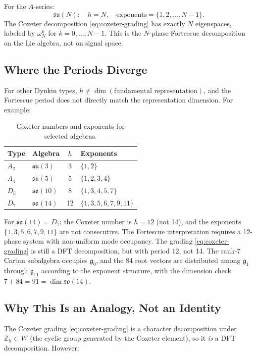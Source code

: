 \documentclass[11pt]{article}
\newcommand{\so}{\mathfrak{so}}
\newcommand{\su}{\mathfrak{su}}
\newcommand{\g}{\mathfrak{g}}
\newcommand{\ZZ}{\mathbb{Z}}
\begin{document}
For the $A$-series:
\begin{equation}\label{eq:A-series}
  \su(N): \quad h = N, \quad
  \text{exponents} = \{1, 2, \ldots, N-1\}.
\end{equation}
The Coxeter decomposition \eqref{eq:coxeter-grading} has exactly $N$
eigenspaces, labeled by $\omega_N^k$ for $k = 0, \ldots, N-1$. This
is the $N$-phase Fortescue decomposition on the Lie algebra,
not on signal space.

\subsection{Where the Periods Diverge}

For other Dynkin types, $h \neq \dim(\text{fundamental representation})$,
and the Fortescue period does not directly match the representation
dimension. For example:

\begin{table}[htbp]
\centering
\caption{Coxeter numbers and exponents for selected algebras.}
\label{tab:coxeter}
\begin{tabular}{@{}llcl@{}}
\toprule
Type & Algebra & $h$ & Exponents \\
\midrule
$A_2$ & $\su(3)$ & 3 & $\{1, 2\}$ \\
$A_4$ & $\su(5)$ & 5 & $\{1, 2, 3, 4\}$ \\
$D_5$ & $\so(10)$ & 8 & $\{1, 3, 4, 5, 7\}$ \\
$D_7$ & $\so(14)$ & 12 & $\{1, 3, 5, 6, 7, 9, 11\}$ \\
\bottomrule
\end{tabular}
\end{table}

For $\so(14) = D_7$: the Coxeter number is $h = 12$ (not 14), and the
exponents $\{1, 3, 5, 6, 7, 9, 11\}$ are not consecutive. The
Fortescue interpretation requires a 12-phase system with non-uniform
mode occupancy. The grading \eqref{eq:coxeter-grading} is still a
DFT decomposition, but with period 12, not 14. The rank-7 Cartan
subalgebra occupies $\g_0$, and the 84 root vectors are distributed
among $\g_1$ through $\g_{11}$ according to the exponent structure,
with the dimension check $7 + 84 = 91 = \dim \so(14)$.

\subsection{Why This Is an Analogy, Not an Identity}

The Coxeter grading \eqref{eq:coxeter-grading} is a character
decomposition under $\ZZ_h \subset W$ (the cyclic group generated by
the Coxeter element), so it \emph{is} a DFT decomposition. However:
\end{document}
